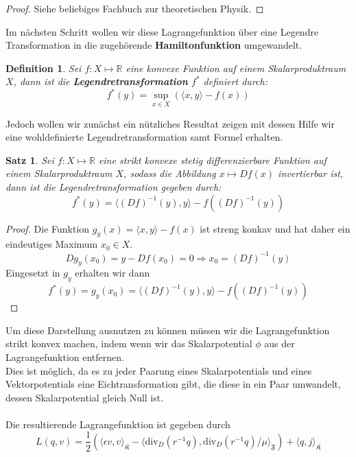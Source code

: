 \documentclass[11pt,a4paper,leqno]{report}
\newtheorem{proposition}{Satz}[chapter]
\newtheorem{definition}[theorem]{Definition}
\numberwithin{equation}{chapter}
\begin{document}
\begin{proof}
Siehe beliebiges Fachbuch zur theoretischen Physik.
\end{proof}
\noindent
Im n\"achsten Schritt wollen wir diese Lagrangefunktion \"uber eine Legendre Transformation in die zugeh\"orende \textbf{Hamiltonfunktion} umgewandelt.
\begin{definition}
	Sei $f:X\mapsto\mathbb{R}$ eine konvexe Funktion auf einem Skalarproduktraum $X$, dann ist die \textbf{Legendretransformation} $f^*$ definiert durch:
	\begin{equation}
		f^*(y) = \sup_{x\in X}(\langle x, y\rangle-f(x))
	\end{equation}
\end{definition}
\noindent
Jedoch wollen wir zun\"achst ein n\"utzliches Resultat zeigen mit dessen Hilfe wir eine wohldefinierte Legendretransformation samt Formel erhalten.
\begin{proposition}
	Sei $f:X\mapsto\mathbb{R}$ eine strikt konvexe stetig differenzierbare Funktion auf einem Skalarproduktraum $X$, sodass die Abbildung $x\mapsto Df(x)$ invertierbar ist, dann ist die Legendretransformation gegeben durch:
	\begin{equation}
		f^*(y) = \langle (Df)^{-1}(y), y\rangle-f((Df)^{-1}(y))
	\end{equation}
\end{proposition}
\begin{proof}
Die Funktion $g_y(x)=\langle x, y\rangle-f(x)$ ist streng konkav und hat daher ein eindeutiges Maximum $x_0\in X$.
\begin{equation*}
	Dg_y(x_0) = y - Df(x_0)=0\Rightarrow x_0 = (Df)^{-1}(y)
\end{equation*}
Eingesetzt in $g_y$ erhalten wir dann
\begin{equation*}
	f^*(y)=g_y(x_0) = \langle (Df)^{-1}(y), y\rangle-f((Df)^{-1}(y))
\end{equation*}
\end{proof}
\noindent
Um diese Darstellung ausnutzen zu k\"onnen m\"ussen wir die Lagrangefunktion strikt konvex machen, indem wenn wir das Skalarpotential $\phi$ aus der Lagrangefunktion entfernen.\\
Dies ist m\"oglich, da es zu jeder Paarung eines Skalarpotentials und eines Vektorpotentials eine Eichtransformation gibt, die diese in ein Paar umwandelt, dessen Skalarpotential gleich Null ist.\\
\\
Die resultierende Lagrangefunktion ist gegeben durch 
\begin{equation}
	L(q, v) =\frac{1}{2}(\langle \epsilon v, v\rangle_\mathfrak{K} - \langle\text{div}_D(r^{-1}q), \text{div}_D(r^{-1}q)/\mu\rangle_\mathfrak{F}) + \langle q, j\rangle_\mathfrak{K}
\end{equation}
\end{document}
